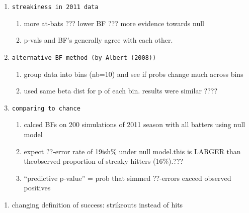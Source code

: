 \documentclass[12pt,twoside]{dukestatscithesis}
\providecommand{\tightlist}{%
  \setlength{\itemsep}{0pt}\setlength{\parskip}{0pt}}
\theoremstyle{definition}
\theoremstyle{definition}
\theoremstyle{definition}
\theoremstyle{remark}
\begin{document}
\begin{enumerate}
\def\labelenumi{\arabic{enumi}.}
\item
\begin{verbatim}
streakiness in 2011 data
\end{verbatim}
  \begin{enumerate}
  \def\labelenumii{\alph{enumii}.}
  \tightlist
  \item
    more at-bats ??? lower BF ??? more evidence towards null
  \item
    p-vals and BF's generally agree with each other.
  \end{enumerate}
\item
\begin{verbatim}
alternative BF method (by Albert (2008))
\end{verbatim}
  \begin{enumerate}
  \def\labelenumii{\alph{enumii}.}
  \tightlist
  \item
    group data into bins (nb=10) and see if probs change much across
    bins
  \item
    used same beta dist for p of each bin. results were similar ????
  \end{enumerate}
\item
\begin{verbatim}
comparing to chance
\end{verbatim}
  \begin{enumerate}
  \def\labelenumii{\alph{enumii}.}
  \tightlist
  \item
    calced BFs on 200 simulations of 2011 season with all batters using
    null model
  \item
    expect ??-error rate of 19ish\% under null model.this is LARGER than
    theobserved proportion of streaky hitters (16\%).???
  \item
    ``predictive p-value'' = prob that simmed ??-errors exceed observed
    positives
  \end{enumerate}
\end{enumerate}
\begin{enumerate}
\def\labelenumi{\Alph{enumi}.}
\setcounter{enumi}{4}
\tightlist
\item
  changing definition of success: strikeouts instead of hits
\end{enumerate}
\end{document}
